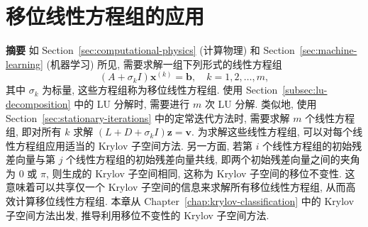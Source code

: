 \clearpage\section{{移位线性方程组的应用}}\label{chap:shifted-linear-systems}
\setcounter{footnote}{0}
\noindent\textbf{{摘要}}\quad
{如 Section\ \ref{sec:computational-physics} (计算物理) 和 Section\ \ref{sec:machine-learning} (机器学习) 所见, 需要求解一组下列形式的线性方程组}
\[(A+\sigma_k I)\bm x^{(k)}=\bm b,\quad k=1,2,\ldots,m,\]
{其中 $\sigma_k$ 为标量, 这些方程组称为移位线性方程组. 使用 Section\ \ref{subsec:lu-decomposition} 中的 LU 分解时, 需要进行 $m$ 次 LU 分解. 类似地, 使用 Section\ \ref{sec:stationary-iterations} 中的定常迭代方法时, 需要求解 $m$ 个线性方程组, 即对所有 $k$ 求解 $(L+D+\sigma_k I)\bm z=\bm v$. 为求解这些线性方程组, 可以对每个线性方程组应用适当的 Krylov 子空间方法. 另一方面, 若第 $i$ 个线性方程组的初始残差向量与第 $j$ 个线性方程组的初始残差向量共线, 即两个初始残差向量之间的夹角为 $0$ 或 $\pi$, 则生成的 Krylov 子空间相同, 这称为 Krylov 子空间的移位不变性. 这意味着可以共享仅一个 Krylov 子空间的信息来求解所有移位线性方程组, 从而高效计算移位线性方程组. 本章从 Chapter\ \ref{chap:krylov-classification} 中的 Krylov 子空间方法出发, 推导利用移位不变性的 Krylov 子空间方法.}
